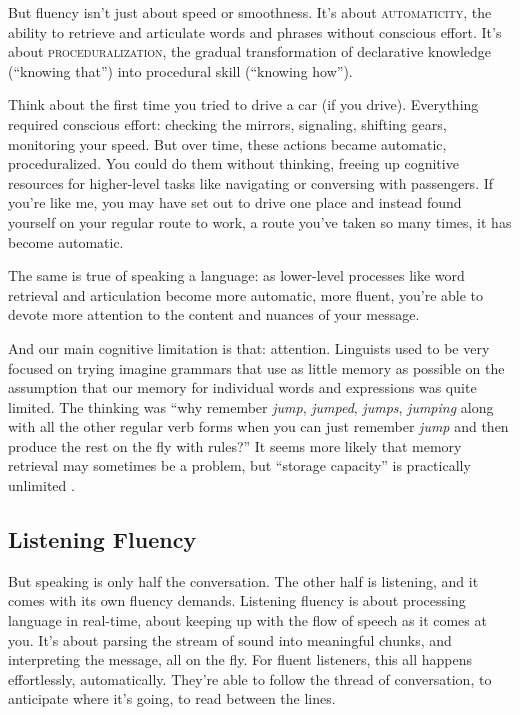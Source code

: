 But fluency isn't just about speed or smoothness. It's about \textsc{automaticity}, the ability to retrieve and articulate words and phrases without conscious effort. It's about \textsc{proceduralization}, the gradual transformation of declarative knowledge (``knowing that'') into procedural skill (``knowing how'').

Think about the first time you tried to drive a car (if you drive). Everything required conscious effort: checking the mirrors, signaling, shifting gears, monitoring your speed. But over time, these actions became automatic, proceduralized. You could do them without thinking, freeing up cognitive resources for higher-level tasks like navigating or conversing with passengers. If you're like me, you may have set out to drive one place and instead found yourself on your regular route to work, a route you've taken so many times, it has become automatic.

The same is true of speaking a language: as lower-level processes like word retrieval and articulation become more automatic, more fluent, you're able to devote more attention to the content and nuances of your message.

And our main cognitive limitation is that: attention. Linguists used to be very focused on trying imagine grammars that use as little memory as possible on the assumption that our memory for individual words and expressions was quite limited. The thinking was ``why remember \textit{jump}, \textit{jumped}, \textit{jumps}, \textit{jumping} along with all the other regular verb forms when you can just remember \textit{jump} and then produce the rest on the fly with rules?'' It seems more likely that memory retrieval may sometimes be a problem, but ``storage capacity'' is practically unlimited \citep{Erman2000, JackendoffAudring2018}.

\subsection{Listening Fluency}

But speaking is only half the conversation. The other half is listening, and it comes with its own fluency demands. Listening fluency is about processing language in real-time, about keeping up with the flow of speech as it comes at you. It's about parsing the stream of sound into meaningful chunks, and interpreting the message, all on the fly. For fluent listeners, this all happens effortlessly, automatically. They're able to follow the thread of conversation, to anticipate where it's going, to read between the lines.

